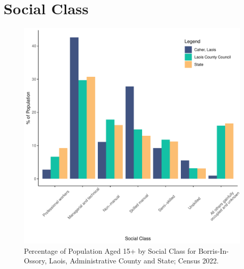 \documentclass{article}
\begin{document}
\section{Social Class}\label{sect:SC}
\begin{figure}[H]
	\centering
	\includegraphics[width = 140mm]{../figures/SocialClassED.pdf}
	\caption{Percentage of Population Aged 15+ by Social Class for Borris-In-Ossory, Laois, Administrative County and State; Census 2022.}
	\label{fig:vbnv}
	\end{figure}
\end{document}
